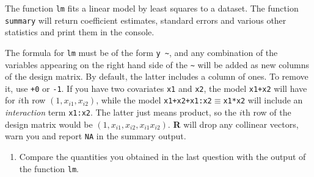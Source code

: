 \documentclass[]{book}
\newenvironment{Shaded}{\begin{snugshade}}{\end{snugshade}}
\newcommand{\KeywordTok}[1]{\textcolor[rgb]{0.13,0.29,0.53}{\textbf{#1}}}
\newcommand{\DataTypeTok}[1]{\textcolor[rgb]{0.13,0.29,0.53}{#1}}
\newcommand{\DecValTok}[1]{\textcolor[rgb]{0.00,0.00,0.81}{#1}}
\newcommand{\StringTok}[1]{\textcolor[rgb]{0.31,0.60,0.02}{#1}}
\newcommand{\CommentTok}[1]{\textcolor[rgb]{0.56,0.35,0.01}{\textit{#1}}}
\newcommand{\ControlFlowTok}[1]{\textcolor[rgb]{0.13,0.29,0.53}{\textbf{#1}}}
\newcommand{\OperatorTok}[1]{\textcolor[rgb]{0.81,0.36,0.00}{\textbf{#1}}}
\newcommand{\NormalTok}[1]{#1}
\providecommand{\tightlist}{%
  \setlength{\itemsep}{0pt}\setlength{\parskip}{0pt}}
\theoremstyle{definition}
\theoremstyle{definition}
\theoremstyle{definition}
\theoremstyle{remark}
\begin{document}
\begin{Shaded}
\end{Shaded}

The function \texttt{lm} fits a linear model by least squares to a
dataset. The function \texttt{summary} will return coefficient
estimates, standard errors and various other statistics and print them
in the console.

The formula for \texttt{lm} must be of the form
\texttt{y\ \textasciitilde{}}, and any combination of the variables
appearing on the right hand side of the \texttt{\textasciitilde{}} will
be added as new columns of the design matrix. By default, the latter
includes a column of ones. To remove it, use \texttt{+0} or \texttt{-1}.
If you have two covariates \texttt{x1} and \texttt{x2}, the model
\texttt{x1+x2} will have for \(i\)th row \((1, x_{i1}, x_{i2})\), while
the model \texttt{x1+x2+x1:x2}\(\equiv\)\texttt{x1*x2} will include an
\emph{interaction} term \texttt{x1:x2}. The latter just means product,
so the \(i\)th row of the design matrix would be
\((1, x_{i1}, x_{i2}, x_{i1}x_{i2})\). \textbf{R} will drop any
collinear vectors, warn you and report \texttt{NA} in the summary
output.

\begin{enumerate}
\def\labelenumi{\alph{enumi}.}
\setcounter{enumi}{4}
\tightlist
\item
  Compare the quantities you obtained in the last question with the
  output of the function \texttt{lm}.
\end{enumerate}
\end{document}
